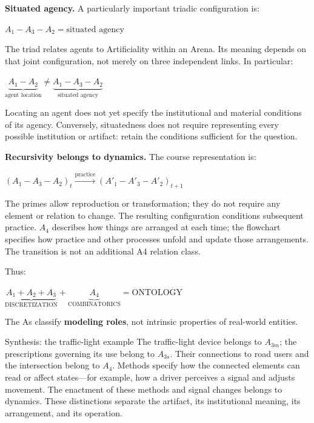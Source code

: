\documentclass[11pt,a4paper]{article}
\newenvironment{fitdisplay}{\par\medskip\noindent\begin{lrbox}{\displaybox}$\displaystyle}{%
$\end{lrbox}\makebox[\linewidth][c]{\ifdim\wd\displaybox>\linewidth\resizebox{\linewidth}{!}{\usebox{\displaybox}}\else\usebox{\displaybox}\fi}\par\medskip}
\begin{document}
\textbf{Situated agency.} A particularly important triadic configuration is:
\begin{fitdisplay}
\boxed{A_1-A_3-A_2=\text{situated agency}}
\end{fitdisplay}
The triad relates agents to Artificiality within an Arena. Its meaning depends on that joint configuration, not merely on three independent links. In particular:
\begin{fitdisplay}
\boxed{\underbrace{A_1-A_2}_{\text{agent location}}
\neq \underbrace{A_1-A_3-A_2}_{\text{situated agency}}}
\end{fitdisplay}
Locating an agent does not yet specify the institutional and material conditions of its agency. Conversely, situatedness does not require representing every possible institution or artifact: retain the conditions sufficient for the question.

\textbf{Recursivity belongs to dynamics.} The course representation is:
\begin{fitdisplay}
\boxed{(A_1-A_3-A_2)_t\xrightarrow{\text{practice}}
(A'_1-A'_3-A'_2)_{t+1}}
\end{fitdisplay}
The primes allow reproduction or transformation; they do not require any element or relation to change. The resulting configuration conditions subsequent practice. $A_4$ describes how things are arranged at each time; the flowchart specifies how practice and other processes unfold and update those arrangements. The transition is not an additional A4 relation class.

Thus:

\begin{fitdisplay}
\boxed{
\underbrace{A_1+A_2+A_3}_{\text{DISCRETIZATION}}
+
\underbrace{A_4}_{\text{COMBINATORICS}}
=
\text{ONTOLOGY}
}
\end{fitdisplay}

The As classify \textbf{modeling roles}, not intrinsic properties of real-world entities.

\begin{principle}{Synthesis: the traffic-light example}
The traffic-light device belongs to $A_{3m}$; the prescriptions governing its use belong to $A_{3s}$. Their connections to road users and the intersection belong to $A_4$. Methods specify how the connected elements can read or affect states---for example, how a driver perceives a signal and adjusts movement. The enactment of these methods and signal changes belongs to dynamics. These distinctions separate the artifact, its institutional meaning, its arrangement, and its operation.
\end{principle}
\end{document}
